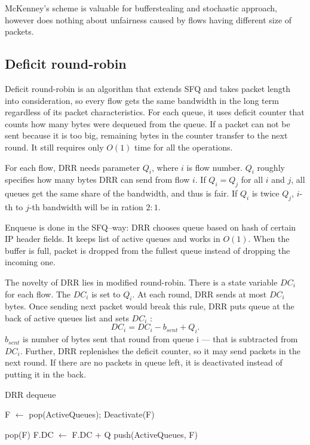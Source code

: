 McKenney's scheme is valuable for bufferstealing and stochastic approach, however does nothing about unfairness caused by flows having different size of packets.

\subsection{Deficit round-robin}
\label{DRR}
Deficit round-robin \cite{EffDRR} is an algorithm that extends SFQ and takes packet length into consideration, so every flow gets the same bandwidth in the long term regardless of its packet characteristics. For each queue, it uses deficit counter that counts how many bytes were dequeued from the queue. If a packet can not be sent because it is too big, remaining bytes in the counter transfer to the next round. It still requires only $O(1)$ time for all the operations.

For each flow, DRR needs parameter $Q_i$, where $i$ is flow number. $Q_i$ roughly specifies how many bytes DRR can send from flow $i$. If $Q_i = Q_j$ for all $i$ and $j$, all queues get the same share of the bandwidth, and thus is fair. If $Q_i$ is twice $Q_j$, $i$-th to $j$-th bandwidth will be in ration $2:1$.

Enqueue is done in the SFQ--way: DRR chooses queue based on hash of certain IP header fields. It keeps list of active queues and works in $O(1)$. When the buffer is full, packet is dropped from the fullest queue instead of dropping the incoming one.

The novelty of DRR lies in modified round-robin. There is a state variable $DC_i$ for each flow. The $DC_i$ is set to $Q_i$. At each round, DRR sends at most $DC_i$ bytes. Once sending next packet would break this rule, DRR puts queue  at the back of active queues list and sets $DC_i$ :
\[
  DC_i = DC_i - b_{sent} + Q_i.
\]
$b_{sent}$ is number of bytes sent that round from queue i --- that is subtracted from $DC_i$. Further, DRR replenishes the deficit counter, so it may send packets in the next round. If there are no packets in queue left, it is deactivated instead of putting it in the back.

\begin{algorithm}
	\caption{DRR dequeue}
	\label{alg01:DRR_deq}
	\begin{algorithmic}
			\State F $\leftarrow$ pop(ActiveQueues);
				\State Deactivate(F)
				
					\State \Return pop(F)
			\Else {}
				\State F.DC $\leftarrow$ F.DC + Q
				\State push(ActiveQueues, F)
			\EndIf
		\EndWhile
	\end{algorithmic}
\end{algorithm}

